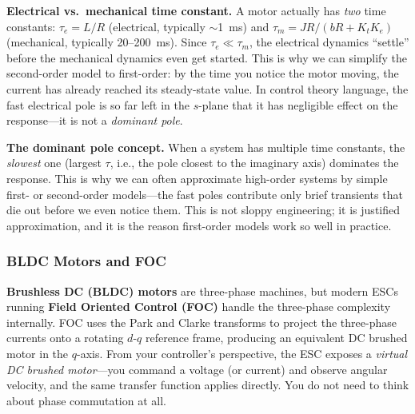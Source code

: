 \begin{mdframed}[linewidth=1pt, innertopmargin=10pt, innerbottommargin=10pt]
\textbf{Electrical vs.\ mechanical time constant.} A motor actually has \textit{two} time constants: $\tau_e = L/R$ (electrical, typically $\sim$1~ms) and $\tau_m = JR/(bR + K_tK_e)$ (mechanical, typically 20--200~ms). Since $\tau_e \ll \tau_m$, the electrical dynamics ``settle'' before the mechanical dynamics even get started. This is why we can simplify the second-order model to first-order: by the time you notice the motor moving, the current has already reached its steady-state value. In control theory language, the fast electrical pole is so far left in the $s$-plane that it has negligible effect on the response---it is not a \textit{dominant pole}.

\textbf{The dominant pole concept.} When a system has multiple time constants, the \textit{slowest} one (largest $\tau$, i.e., the pole closest to the imaginary axis) dominates the response. This is why we can often approximate high-order systems by simple first- or second-order models---the fast poles contribute only brief transients that die out before we even notice them. This is not sloppy engineering; it is justified approximation, and it is the reason first-order models work so well in practice.
\end{mdframed}

\subsubsection*{BLDC Motors and FOC}

\textbf{Brushless DC (BLDC) motors} are three-phase machines, but modern ESCs running \textbf{Field Oriented Control (FOC)} handle the three-phase complexity internally. FOC uses the Park and Clarke transforms to project the three-phase currents onto a rotating $d$-$q$ reference frame, producing an equivalent DC brushed motor in the $q$-axis. From your controller's perspective, the ESC exposes a \emph{virtual DC brushed motor}---you command a voltage (or current) and observe angular velocity, and the same transfer function applies directly. You do not need to think about phase commutation at all.

